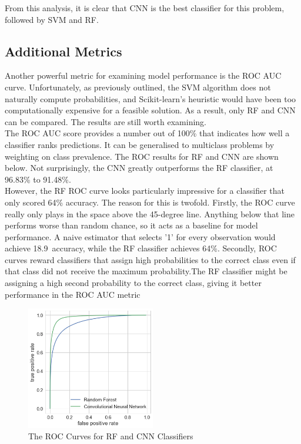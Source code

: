 \documentclass[12pt]{article}
\begin{document}
From this analysis, it is clear that CNN is the best classifier for this problem, followed by SVM and RF.\\

\subsection{Additional Metrics}

Another powerful metric for examining model performance is the ROC AUC curve. Unfortunately, as previously outlined, the SVM algorithm does not naturally compute probabilities, and Scikit-learn's heuristic would have been too computationally expensive for a feasible solution. As a result, only RF and CNN can be compared. The results are still worth examining.\\

The ROC AUC score provides a number out of 100\% that indicates how well a classifier ranks predictions. It can be generalised to multiclass problems by weighting on class prevalence. The ROC results for RF and CNN are shown below. Not surprisingly, the CNN greatly outperforms the RF classifier, at 96.83\% to 91.48\%.\\

However, the RF ROC curve looks particularly impressive for a classifier that only scored 64\% accuracy. The reason for this is twofold. Firstly, the ROC curve really only plays in the space above the 45-degree line. Anything below that line performs worse than random chance, so it acts as a baseline for model performance. A naive estimator that selects '1' for every observation would achieve 18.9\ accuracy, while the RF classifier achieves 64\%. Secondly, ROC curves reward classifiers that assign high probabilities to the correct class even if that class did not receive the maximum probability.The RF classifier might be assigning a high second probability to the correct class, giving it better performance in the ROC AUC metric

\begin{figure}[h]
\caption{The ROC Curves for RF and CNN Classifiers} 
\centering
\includegraphics[width=0.5\textwidth]{images/roc_curves.png}
\end{figure}
\end{document}
